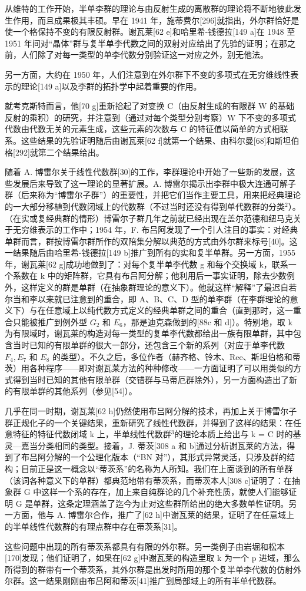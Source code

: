 从维特的工作开始，半单李群的理论与由反射生成的离散群的理论将不断地彼此发生作用，而且成果极其丰硕。早在 1941 年，施蒂费尔{[}296{]}就指出，外尔群恰好是使一个格保持不变的有限反射群。谢瓦莱{[}62 e{]}和哈里希-钱德拉{[}149 a{]}在 1948 至 1951 年间对“晶体”群与复半单李代数之间的双射对应给出了先验的证明；在那之前，人们除了对每一类型的单李代数分别验证这一对应之外，别无他法。

另一方面，大约在 1950 年，人们注意到在外尔群下不变的多项式在无穷维线性表示的理论{[}149 a{]}以及李群的拓扑学中起着重要的作用。

就考克斯特而言，他{[}70 g{]}重新拾起了对变换 C（由反射生成的有限群 W 的基础反射的乘积）的研究，并注意到（通过对每个类型分别考察）W 下不变的多项式代数由代数无关的元素生成，这些元素的次数与 C 的特征值以简单的方式相联系。这些结果的先验证明随后由谢瓦莱{[}62 f{]}就第一个结果、由科尔曼{[}68{]}和斯坦伯格{[}292{]}就第二个结果给出。

随着 A. 博雷尔关于线性代数群{[}30{]}的工作，李群理论中开始了一些新的发展，这些发展后来导致了这一理论的显著扩展。A. 博雷尔揭示出李群中极大连通可解子群（后来称为“博雷尔子群”）的重要性，并把它们当作主要工具，用来把经典理论的一大部分移植到代数闭域上的代数群（不过当时还没有得到单代数群的分类\(^{2}\)）。（在实或复经典群的情形）博雷尔子群几年之前就已经出现在盖尔范德和纽马克关于无穷维表示的工作中；1954 年，F. 布吕阿发现了一个引人注目的事实：对经典单群而言，群按博雷尔群所作的双陪集分解以典范的方式由外尔群来标号{[}40{]}。这一结果随后由哈里希-钱德拉{[}149 b{]}推广到所有的实和复半单群。另一方面，1955 年，谢瓦莱{[}62 g{]}成功地做到了：对每个复半单李代数 g 和每个交换域 k，联系一个系数在 k 中的矩阵群，它具有布吕阿分解；他利用后一事实证明，除去少数例外，这样定义的群是单群（在抽象群理论的意义下）。他就这样“解释”了最迟自若尔当和李以来就已注意到的重合，即 A、B、C、D 型的单李群（在李群理论的意义下）与在任意域上以纯代数方式定义的经典单群之间的重合（直到那时，这一重合只能被推广到例外型 \(G_{2}\) 和 \(E_{6}\)，那是迪克森做到的{[}88c 和 d{]}）。特别地，取 k 为有限域时，谢瓦莱的构造对每一类型的复单李代数都给出一族有限单群，其中包含当时已知的有限单群的很大一部分，还包含三个新的系列（对应于单李代数 \(F_{4}, E_{7}\) 和 \(E_{8}\) 的类型）。不久之后，多位作者（赫齐格、铃木、Ree、斯坦伯格和蒂茨）用各种程序——即对谢瓦莱方法的种种修改——一方面证明了可以用类似的方式得到当时已知的其他有限单群（交错群与马蒂厄群除外），另一方面构造出了新的有限单群的其他系列（参见{[}54{]}）。

几乎在同一时期，谢瓦莱{[}62 h{]}仍然使用布吕阿分解的技术，再加上关于博雷尔子群正规化子的一个关键结果，重新研究了线性代数群，并得到了这样的结果：在任意特征的特征代数闭域 k 上，半单线性代数群\(^{3}\)的理论本质上给出与 k = C 时的基灵—嘉当分类相同的类型。接着，J. 蒂茨{[}308 a 和 b{]}通过分析谢瓦莱的方法，得到了布吕阿分解的一个公理化版本（“BN 对”），其形式异常灵活，只涉及群的结构；目前正是这一概念以“蒂茨系”的名称为人所知。我们在上面谈到的所有单群（该词各种意义下的单群）都典范地带有蒂茨系，而蒂茨本人{[}308 c{]}证明了：在抽象群 G 中这样一个系的存在，加上来自纯群论的几个补充性质，就使人们能够证明 G 是单群，这条定理涵盖了迄今为止对这些群所给出的绝大多数单性证明。另一方面，他与 A. 博雷尔合作，推广了{[}62 h{]}中谢瓦莱的结果，证明了在任意域上的半单线性代数群的有理点群中存在蒂茨系{[}31{]}。

这些问题中出现的所有蒂茨系都具有有限的外尔群。另一类例子由岩堀和松本{[}170{]}发现；他们证明了，如果在{[}62 g{]}中谢瓦莱的构造里取 k 为一个 p 进域，那么所得到的群带有一个蒂茨系，其外尔群是出发时所用的那个复半单李代数的仿射外尔群。这一结果刚刚由布吕阿和蒂茨{[}41{]}推广到局部域上的所有半单代数群。

